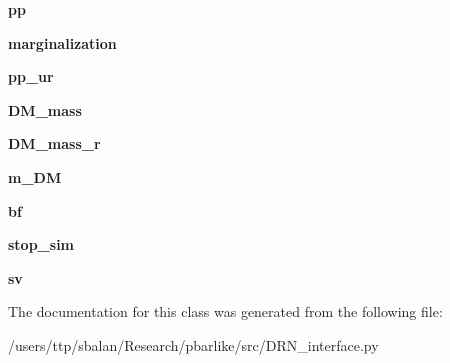 \begin{DoxyCompactItemize}
{\bfseries pp}
\item 
\mbox{\label{classDRN__interface_1_1DRNet_a733d8503e2de87f8cd6237b7110e0b27}} 
{\bfseries marginalization}
\item 
\mbox{\label{classDRN__interface_1_1DRNet_a47bbde9c65b6b994ad1c9a5bc9fddecc}} 
{\bfseries pp\+\_\+ur}
\item 
\mbox{\label{classDRN__interface_1_1DRNet_a3773f6527a211f344ea670b546ad32c9}} 
{\bfseries D\+M\+\_\+mass}
\item 
\mbox{\label{classDRN__interface_1_1DRNet_a670d8afbc85c0f9b1870eeb59a5c6e7b}} 
{\bfseries D\+M\+\_\+mass\+\_\+r}
\item 
\mbox{\label{classDRN__interface_1_1DRNet_a2d67305e9b95f67cbf094e1c35124715}} 
{\bfseries m\+\_\+\+DM}
\item 
\mbox{\label{classDRN__interface_1_1DRNet_af6bcca724d99c6c517aabf3f88be26a5}} 
{\bfseries bf}
\item 
\mbox{\label{classDRN__interface_1_1DRNet_a6a4deb0b60b0e847558e03cf814702a2}} 
{\bfseries stop\+\_\+sim}
\item 
\mbox{\label{classDRN__interface_1_1DRNet_af7e8b35236eae3e8744f17fdd12b8ace}} 
{\bfseries sv}
\end{DoxyCompactItemize}


The documentation for this class was generated from the following file\+:\begin{DoxyCompactItemize}
\item 
/users/ttp/sbalan/\+Research/pbarlike/src/D\+R\+N\+\_\+interface.\+py\end{DoxyCompactItemize}
